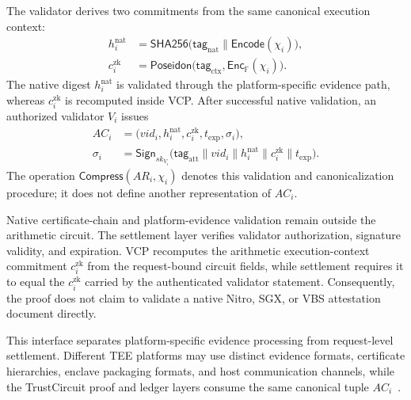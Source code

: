 \documentclass[10pt,journal,compsoc]{IEEEtran}
\begin{document}
The validator derives two commitments from the same canonical execution context:
\begin{equation}
\begin{aligned}
h_i^{\mathrm{nat}} &= \mathsf{SHA256} \bigl( \mathsf{tag}_{\mathrm{nat}} \parallel \mathsf{Encode}(\chi_i) \bigr),\\ c_i^{\mathrm{zk}} &= \mathsf{Poseidon} \bigl( \mathsf{tag}_{\mathrm{ctx}}, \mathsf{Enc}_{\mathbb{F}}(\chi_i) \bigr).
\end{aligned}
\label{eq:dual_domain_context_commitments}
\end{equation}
The native digest $h_i^{\mathrm{nat}}$ is validated through the platform-specific evidence path, whereas $c_i^{\mathrm{zk}}$ is recomputed inside VCP. After successful native validation, an authorized validator $V_i$ issues
\begin{equation}
\begin{aligned}
AC_i &= \bigl( vid_i, h_i^{\mathrm{nat}}, c_i^{\mathrm{zk}}, t_{\mathrm{exp}}, \sigma_i \bigr),\\
\sigma_i &= \mathsf{Sign}_{sk_{V_i}} \bigl( \mathsf{tag}_{\mathrm{att}} \parallel vid_i \parallel h_i^{\mathrm{nat}} \parallel c_i^{\mathrm{zk}} \parallel t_{\mathrm{exp}} \bigr).
\end{aligned}
\label{eq:canonical_attestation_statement}
\end{equation}
The operation $\mathsf{Compress}(AR_i,\chi_i)$ denotes this validation and canonicalization procedure; it does not define another representation of $AC_i$.

Native certificate-chain and platform-evidence validation remain outside the arithmetic circuit. The settlement layer verifies validator authorization, signature validity, and expiration. VCP recomputes the arithmetic execution-context commitment $c_i^{\mathrm{zk}}$ from the request-bound circuit fields, while settlement requires it to equal the $c_i^{\mathrm{zk}}$ carried by the authenticated validator statement. Consequently, the proof does not claim to validate a native Nitro, SGX, or VBS attestation document directly.

This interface separates platform-specific evidence processing from request-level settlement. Different TEE platforms may use distinct evidence formats, certificate hierarchies, enclave packaging formats, and host communication channels, while the TrustCircuit proof and ledger layers consume the same canonical tuple $AC_i$~\cite{cheng2019ekiden,brossard2023private,delignat2025transparent}.
\end{document}
